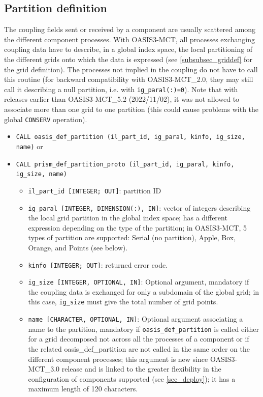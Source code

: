 \subsection{Partition definition}
\label{subsubsec_Partition}

The coupling fields sent or received by a component are usually
scattered among the different component processes. With OASIS3-MCT,
all processes exchanging coupling data have to describe, in a global index space, the local
partitioning of the different grids onto which the data is expressed (see \ref{subsubsec_griddef} for the grid definition).
The processes not implied in the
coupling do not have to call this routine (for backward compatibility with OASIS3-MCT\_2.0,
they may still call it describing a null partition, i.e. with {\tt ig\_paral(:)=0}).
Note that with releases earlier than OASIS3-MCT\_5.2 (2022/11/02), it was not allowed to associate more than one grid to one
partition (this could cause problems with the global {\tt CONSERV} operation).

\begin{itemize}

  \vspace{0.2cm}
\item {\tt CALL oasis\_def\_partition (il\_part\_id, ig\_paral,
    kinfo, ig\_size, name)} or
\item {\tt CALL prism\_def\_partition\_proto (il\_part\_id, ig\_paral,
    kinfo, ig\_size, name)}

  \begin{itemize}
  \item {\tt il\_part\_id [INTEGER; OUT]}: partition ID
  \item {\tt ig\_paral [INTEGER, DIMENSION(:), IN]}: vector of
    integers describing the local grid partition in the global index space;
    has a different expression depending on the type of the partition;
    in OASIS3-MCT, 5 types of partition are supported: Serial (no
    partition), Apple, Box, Orange, and Points (see below).
  \item {\tt kinfo [INTEGER; OUT]}: returned error code.
  \item {\tt ig\_size [INTEGER, OPTIONAL, IN]}: Optional argument, mandatory
    if the coupling data is exchanged for only a subdomain of the
    global grid; in this case, {\tt ig\_size} must give the total number of grid points.  
  \item {\tt name [CHARACTER, OPTIONAL, IN]}: Optional argument associating a name to the partition,
    mandatory if {\tt oasis\_def\_partition} is called either for a grid
    decomposed not across all the processes of a component or if the related
    oasis\_def\_partition are not
    called in the same order on the different component processes;
    this argument is new since OASIS3-MCT\_3.0 release and is linked to the
    greater flexibility in the configuration of components supported
    (see \ref{sec_deploy}); it has a maximum length of 120 characters. 
  \end{itemize}
\end{itemize}

